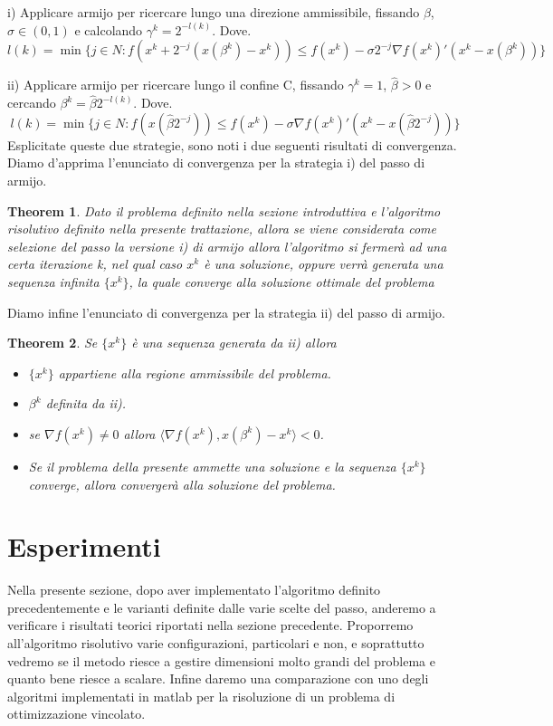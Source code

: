 \documentclass{article}
\newtheorem{theorem}{Theorem}[section]
\begin{document}
i) Applicare armijo per ricercare lungo una direzione ammissibile, fissando $\beta$, $\sigma \in (0,1)$ e calcolando $\gamma^k = 2^{-l(k)}$. Dove.
\[l(k) = \min \{j \in N : f(x^k + 2^{-j}(x(\beta^k) - x^k)) \leq f(x^k) - \sigma 2^{-j} \nabla f(x^k)'(x^k - x(\beta^k)) \}\]

ii) Applicare armijo per ricercare lungo il confine C, fissando $\gamma^k = 1$, ${\hat{\beta} > 0}$ e cercando $\beta^k =\hat{\beta}2^{-l(k)}$. Dove. 
\[l(k) = \min \{j \in N : f(x(\hat{\beta}2^{-j})) \leq f(x^k) - \sigma \nabla f(x^k)'(x^k - x(\hat{\beta}2^{-j})) \}\]
Esplicitate queste due strategie, sono noti i due seguenti risultati di convergenza.\\
Diamo d'apprima l'enunciato di convergenza per la strategia i) del passo di armijo.
\begin{theorem}
Dato il problema definito nella sezione introduttiva e l'algoritmo risolutivo definito nella presente trattazione, allora se viene considerata come selezione del passo la versione i) di armijo allora l'algoritmo si fermerà ad una certa iterazione k, nel qual caso $x^k$ è una soluzione, oppure verrà generata una sequenza infinita $\{x^k\}$, la quale converge alla soluzione ottimale del problema
\end{theorem}
Diamo infine l'enunciato di convergenza per la strategia ii) del passo di armijo.
\begin{theorem}
Se $\{x^k\}$ è una sequenza generata da ii) allora\\
\begin{itemize}
    \item $\{x^k\}$ appartiene alla regione ammissibile del problema.
    \item $\beta^k$ definita da ii).
    \item se $\nabla f(x^k) \neq 0$ allora $\langle \nabla f(x^k), x(\beta^k) - x^k \rangle < 0$.
    \item Se il problema della presente ammette una soluzione e la sequenza $\{x^k\}$ converge, allora convergerà alla soluzione del problema.
\end{itemize}
\end{theorem}
\section{Esperimenti}
Nella presente sezione, dopo aver implementato l'algoritmo definito precedentemente e le varianti definite dalle varie scelte del passo, anderemo a verificare i risultati teorici riportati nella sezione precedente. Proporremo all'algoritmo risolutivo varie configurazioni, particolari e non, e soprattutto vedremo se il metodo riesce a gestire dimensioni molto grandi del problema e quanto bene riesce a scalare. Infine daremo una comparazione con uno degli algoritmi implementati in matlab per la risoluzione di un problema di ottimizzazione vincolato.
\end{document}
